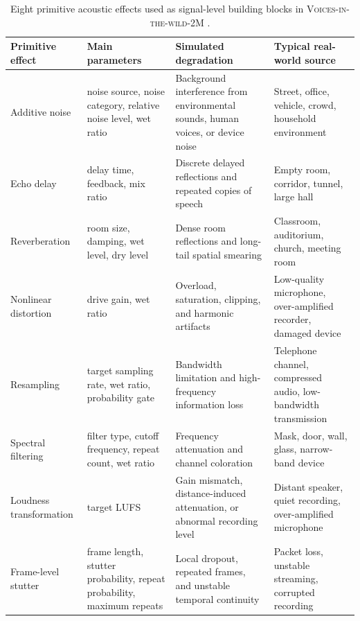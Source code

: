 \documentclass{article}
\begin{document}
\begin{table}[t]
\centering
\small
\setlength{\tabcolsep}{4pt}
\renewcommand{\arraystretch}{1.15}
\caption{Eight primitive acoustic effects used as signal-level building blocks in  \textsc{Voices-in-the-wild-2M} .}
\label{tab:primitive_effects}
\begin{tabular}{p{} p{} p{} p{}}
\toprule
\textbf{Primitive effect} & \textbf{Main parameters} & \textbf{Simulated degradation} & \textbf{Typical real-world source} \\
\midrule
Additive noise
& noise source, noise category, relative noise level, wet ratio
& Background interference from environmental sounds, human voices, or device noise
& Street, office, vehicle, crowd, household environment \\

Echo delay
& delay time, feedback, mix ratio
& Discrete delayed reflections and repeated copies of speech
& Empty room, corridor, tunnel, large hall \\

Reverberation
& room size, damping, wet level, dry level
& Dense room reflections and long-tail spatial smearing
& Classroom, auditorium, church, meeting room \\

Nonlinear distortion
& drive gain, wet ratio
& Overload, saturation, clipping, and harmonic artifacts
& Low-quality microphone, over-amplified recorder, damaged device \\

Resampling
& target sampling rate, wet ratio, probability gate
& Bandwidth limitation and high-frequency information loss
& Telephone channel, compressed audio, low-bandwidth transmission \\

Spectral filtering
& filter type, cutoff frequency, repeat count, wet ratio
& Frequency attenuation and channel coloration
& Mask, door, wall, glass, narrow-band device \\

Loudness transformation
& target LUFS
& Gain mismatch, distance-induced attenuation, or abnormal recording level
& Distant speaker, quiet recording, over-amplified microphone \\

Frame-level stutter
& frame length, stutter probability, repeat probability, maximum repeats
& Local dropout, repeated frames, and unstable temporal continuity
& Packet loss, unstable streaming, corrupted recording \\
\bottomrule
\end{tabular}
\end{table}
\end{document}
